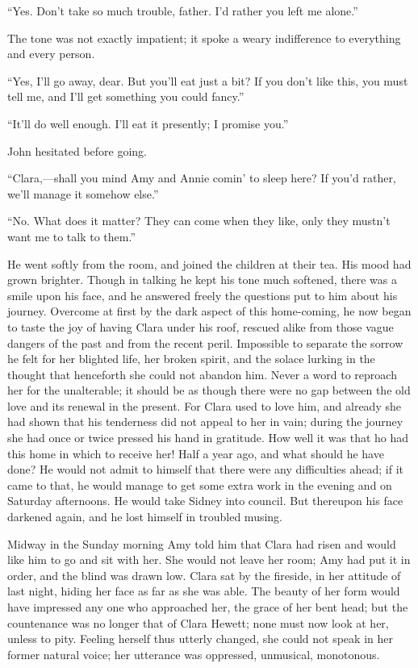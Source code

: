 ``Yes. Don't take so much trouble, father. I'd rather you left me
alone.''

The tone was not exactly impatient; it spoke a weary indifference to
everything and every person.

``Yes, I'll go away, dear. But you'll eat just a bit? If you don't like
this, you must tell me, and I'll get something you could fancy.''

``It'll do well enough. I'll eat it presently; I promise you.''

John hesitated before going.

``Clara,---shall you mind Amy and Annie comin' to sleep here? If you'd
rather, we'll manage it somehow else.''

``No. What does it matter? They can {}come when they like, only they
mustn't want me to talk to them.''

He went softly from the room, and joined the children at their tea. His
mood had grown brighter. Though in talking he kept his tone much
softened, there was a smile upon his face, and he answered freely the
questions put to him about his journey. Overcome at first by the dark
aspect of this home-coming, he now began to taste the joy of having
Clara under his roof, rescued alike from those vague dangers of the past
and from the recent peril. Impossible to separate the sorrow he felt for
her blighted life, her broken spirit, and the solace lurking in the
thought that henceforth she could not abandon him. Never a word to
reproach her for the unalterable; it should be as though there were no
gap between the old love and its renewal in the present. For Clara used
to love him, and already she had shown that his tenderness did not
appeal to her in vain; during the journey she had once or twice pressed
his hand in gratitude. How well it {}was that ho had this home in which
to receive her! Half a year ago, and what should he have done? He would
not admit to himself that there were any difficulties ahead; if it came
to that, he would manage to get some extra work in the evening and on
Saturday afternoons. He would take Sidney into council. But thereupon
his face darkened again, and he lost himself in troubled musing.

Midway in the Sunday morning Amy told him that Clara had risen and would
like him to go and sit with her. She would not leave her room; Amy had
put it in order, and the blind was drawn low. Clara sat by the fireside,
in her attitude of last night, hiding her face as far as she was able.
The beauty of her form would have impressed any one who approached her,
the grace of her bent head; but the countenance was no longer that of
Clara Hewett; none must now look at her, unless to pity. Feeling herself
thus utterly changed, she could not speak in her former natural voice;
her utterance was oppressed, unmusical, monotonous.


